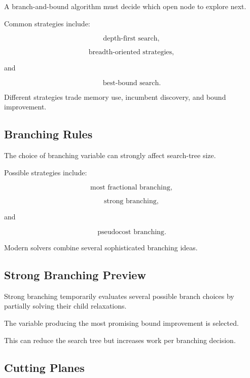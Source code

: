 A branch-and-bound algorithm must decide which open node to explore next.

Common strategies include:

\[
\boxed{
\text{depth-first search},
}
\]

\[
\boxed{
\text{breadth-oriented strategies},
}
\]

and

\[
\boxed{
\text{best-bound search}.
}
\]

Different strategies trade memory use, incumbent discovery, and bound
improvement.

\subsection{Branching Rules}
\label{subsec:branching-rules}

The choice of branching variable can strongly affect search-tree size.

Possible strategies include:

\[
\boxed{
\text{most fractional branching},
}
\]

\[
\boxed{
\text{strong branching},
}
\]

and

\[
\boxed{
\text{pseudocost branching}.
}
\]

Modern solvers combine several sophisticated branching ideas.

\subsection{Strong Branching Preview}
\label{subsec:strong-branching-preview}

Strong branching temporarily evaluates several possible branch choices by
partially solving their child relaxations.

The variable producing the most promising bound improvement is selected.

This can reduce the search tree but increases work per branching decision.

\subsection{Cutting Planes}
\label{subsec:cutting-planes}

